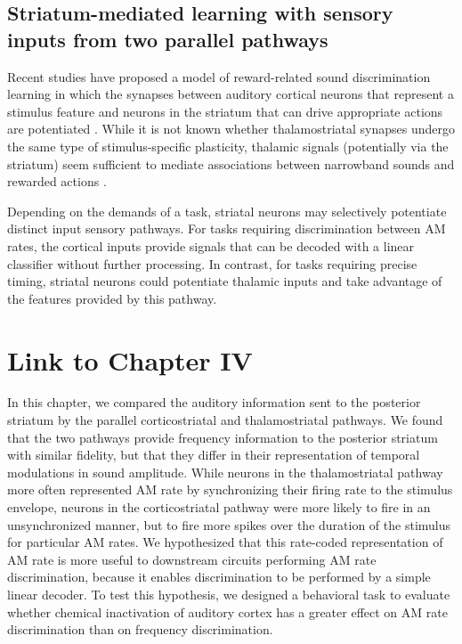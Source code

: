 \subsection{Striatum-mediated learning with sensory inputs from two parallel pathways}

Recent studies have proposed a model of reward-related sound discrimination learning in which the synapses between auditory cortical neurons that represent a stimulus feature and neurons in the striatum that can drive appropriate actions are potentiated \citep{Xiong2015}. 
%
While it is not known whether thalamostriatal synapses undergo the same type of stimulus-specific plasticity, thalamic signals (potentially via the striatum) seem sufficient to mediate associations between narrowband sounds and rewarded actions \citep{Gimenez2015, Guo2018}.
%

Depending on the demands of a task, striatal neurons may selectively potentiate distinct input sensory pathways.
%
For tasks requiring discrimination between AM rates, the cortical inputs provide signals that can be decoded with a linear classifier without further processing.
%
In contrast, for tasks requiring precise timing, striatal neurons could potentiate thalamic inputs and take advantage of the features provided by this pathway. 

\section{Link to Chapter IV}
In this chapter, we compared the auditory information sent to the posterior striatum by the parallel corticostriatal and thalamostriatal pathways.
%
We found that the two pathways provide frequency information to the posterior striatum with similar fidelity, but that they differ in their representation of temporal modulations in sound amplitude. 
%
While neurons in the thalamostriatal pathway more often represented AM rate by synchronizing their firing rate to the stimulus envelope, neurons in the corticostriatal pathway were more likely to fire in an unsynchronized manner, but to fire more spikes over the duration of the stimulus for particular AM rates. 
%
We hypothesized that this rate-coded representation of AM rate is more useful to downstream circuits performing AM rate discrimination, because it enables discrimination to be performed by a simple linear decoder. 
%
To test this hypothesis, we designed a behavioral task to evaluate whether chemical inactivation of auditory cortex has a greater effect on AM rate discrimination than on frequency discrimination. 
